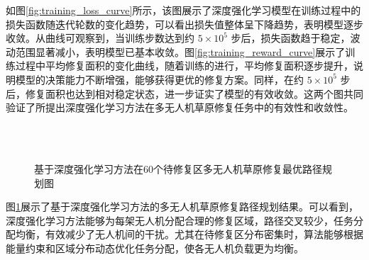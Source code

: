 \documentclass[AutoFakeBold]{LZUThesis}
\begin{document}
如图\ref{fig:training_loss_curve}所示，该图展示了深度强化学习模型在训练过程中的损失函数随迭代轮数的变化趋势，可以看出损失值整体呈下降趋势，表明模型逐步收敛。从曲线可观察到，当训练步数达到约 $5 \times 10^5$ 步后，损失函数趋于稳定，波动范围显著减小，表明模型已基本收敛。图\ref{fig:training_reward_curve}展示了训练过程中平均修复面积的变化曲线，随着训练的进行，平均修复面积逐步提升，说明模型的决策能力不断增强，能够获得更优的修复方案。同样，在约 $5 \times 10^5$ 步后，修复面积也达到相对稳定状态，进一步证实了模型的有效收敛。这两个图共同验证了所提出深度强化学习方法在多无人机草原修复任务中的有效性和收敛性。

\begin{figure}[H]
	\centering
	\subfloat[500边长4机]{\label{fig:DRL_60_500_4}}
	\subfloat[500边长6机]{\label{fig:DRL_60_500_6}}
	\subfloat[500边长8机]{\label{fig:DRL_60_500_8}}\\
	\subfloat[600边长4机]{\label{fig:DRL_60_600_4}}
	\subfloat[600边长6机]{\label{fig:DRL_60_600_6}}
	\subfloat[600边长8机]{\label{fig:DRL_60_600_8}}\\
	\subfloat[700边长4机]{\label{fig:DRL_60_700_4}}
	\subfloat[700边长6机]{\label{fig:DRL_60_700_6}}
	\subfloat[700边长8机]{\label{fig:DRL_60_700_8}}
	\caption{基于深度强化学习方法在60个待修复区多无人机草原修复最优路径规划图}
	\label{fig:RL_combined_uav_routes}
\end{figure}
图\ref{fig:RL_combined_uav_routes}展示了基于深度强化学习方法的多无人机草原修复路径规划结果。可以看到，深度强化学习方法能够为每架无人机分配合理的修复区域，路径交叉较少，任务分配均衡，有效减少了无人机间的干扰。尤其在待修复区分布密集时，算法能够根据能量约束和区域分布动态优化任务分配，使各无人机负载更为均衡。
\end{document}
